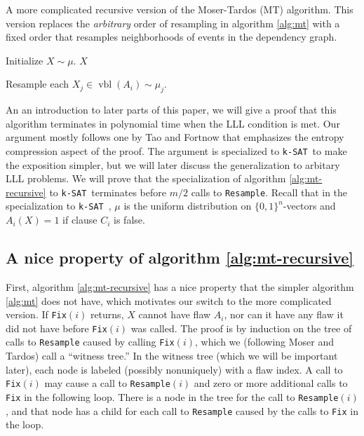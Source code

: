 \documentclass[twocolumn]{article}
\newcommand{\ksat}{\texttt{k-SAT}~}
\newcommand{\hasDist}%
  {\sim}
\begin{document}
\begin{algorithm}[H]
\caption{A more complicated recursive version of the Moser-Tardos (MT) algorithm.  This version replaces the \emph{arbitrary} order of resampling in algorithm \ref{alg:mt} with a fixed order that resamples neighborhoods of events in the dependency graph.}
\label{alg:mt-recursive}
\begin{algorithmic}
  \State Initialize $X \hasDist \mu$.
  \EndFor
  \Return $X$
\EndFunction

    \Return
  \EndIf
  \State {}
  \EndFor
\EndFunction

  \State Resample each $X_j \in \operatorname{vbl}(A_i) \hasDist \mu_j$.
\EndFunction

\end{algorithmic}
\end{algorithm}

An an introduction to later parts of this paper, we will give a proof that this algorithm terminates in polynomial time when the LLL condition is met.  Our argument mostly follows one by Tao \cite{tao2009entropy} and Fortnow \cite{fortnow2009entropy} that emphasizes the entropy compression aspect of the proof.  The argument is specialized to \ksat to make the exposition simpler, but we will later discuss the generalization to arbitary LLL problems.  We will prove that the specialization of algorithm \ref{alg:mt-recursive} to \ksat terminates before $m/2$ calls to \texttt{Resample}. %
Recall that in the specialization to \ksat, $\mu$ is the uniform distribution on $\{0,1\}^n$-vectors and $A_i(X) = 1$ if clause $C_i$ is false.


\subsection{A nice property of algorithm \ref{alg:mt-recursive}}
First, algorithm \ref{alg:mt-recursive} has a nice property that the simpler algorithm \ref{alg:mt} does not have, which motivates our switch to the more complicated version.  If \texttt{Fix}$(i)$ returns, $X$ cannot have flaw $A_i$, nor can it have any flaw it did not have before \texttt{Fix}$(i)$ was called.  The proof is by induction on the tree of calls to \texttt{Resample} caused by calling \texttt{Fix}$(i)$, which we (following Moser and Tardos) call a ``witness tree.''  In the witness tree (which we will be important later), each node is labeled (possibly nonuniquely) with a flaw index.  A call to \texttt{Fix}$(i)$ may cause a call to \texttt{Resample}$(i)$ and zero or more additional calls to \texttt{Fix} in the following loop.  There is a node in the tree for the call to \texttt{Resample}$(i)$, and that node has a child for each call to \texttt{Resample} caused by the calls to \texttt{Fix} in the loop.
\end{document}
